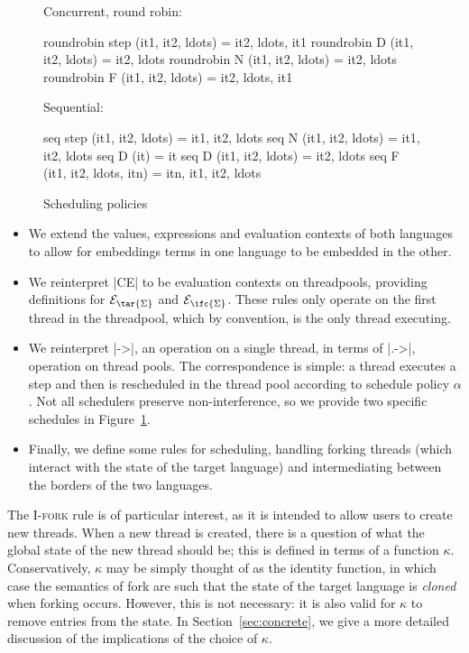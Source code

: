 \begin{figure}
  Concurrent, round robin:
\begin{code}
  roundrobin step (it1, it2, ldots)  = it2, ldots, it1
  roundrobin D (it1, it2, ldots)     = it2, ldots
  roundrobin N (it1, it2, ldots)     = it2, ldots
  roundrobin F (it1, it2, ldots)     = it2, ldots, it1
\end{code}
  Sequential:
\begin{code}
  seq step (it1, it2, ldots)     = it1, it2, ldots
  seq N (it1, it2, ldots)        = it1, it2, ldots
  seq D (it)                     = it
  seq D (it1, it2, ldots)        = it2, ldots
  seq F (it1, it2, ldots, itn)   = itn, it1, it2, ldots
\end{code}
\caption{Scheduling policies}
\label{fig:schedule}
\end{figure}

\begin{itemize}
    \item We extend the values, expressions and evaluation contexts of both languages to allow for embeddings terms in one language to be embedded in the other.
    \item We reinterpret |CE| to be evaluation contexts on threadpools, providing definitions for $\mathcal{E}_{\tar{\Sigma}}$ and $\mathcal{E}_{\ifc{\Sigma}}$.  These rules only operate on the first thread in the threadpool, which by convention, is the only thread executing.
    \item We reinterpret |->|, an operation on a single thread, in terms of |.->|, operation on thread pools.  The correspondence is simple: a thread executes a step and then is rescheduled in the thread pool according to schedule policy $\alpha$.  Not all schedulers preserve non-interference, so we provide two specific schedules in Figure~\ref{fig:schedule}.
    \item Finally, we define some rules for scheduling, handling forking threads (which interact with the state of the target language) and intermediating between the borders of the two languages.
\end{itemize}

The \textsc{I-fork} rule is of particular interest, as it is intended to allow users
to create new threads.  When a new thread is created, there is a question of what the
global state of the new thread should be; this is defined in terms of a function $\kappa$.
Conservatively, $\kappa$ may be simply thought of as the identity function, in which
case the semantics of fork are such that the state of the target language is \emph{cloned}
when forking occurs.  However, this is not necessary: it is also valid for $\kappa$
to remove entries from the state.  In Section~\ref{sec:concrete}, we give a more detailed
discussion of the implications of the choice of $\kappa$.

